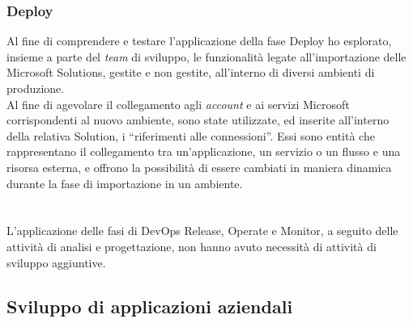 \subsubsection*{Deploy}
Al fine di comprendere e testare l'applicazione della fase Deploy ho esplorato, insieme a parte del \emph{team} di sviluppo, le funzionalità legate all'importazione delle Microsoft Solutions, gestite e non gestite, all'interno di diversi ambienti di produzione.\\ 
Al fine di agevolare il collegamento agli \emph{account} e ai servizi Microsoft corrispondenti al nuovo ambiente, sono state utilizzate, ed inserite all'interno della relativa Solution, i “riferimenti alle connessioni”. Essi sono entità che rappresentano il collegamento tra un'applicazione, un servizio o un flusso e una risorsa esterna, e offrono la possibilità di essere cambiati in maniera dinamica durante la fase di importazione in un ambiente.\\\\\\
L'applicazione delle fasi di \gls{DevOps} Release, Operate e Monitor, a seguito delle attività di analisi e progettazione, non hanno avuto necessità di attività di sviluppo aggiuntive. 

\subsection{Sviluppo di applicazioni aziendali}
\label{sviluppoApplicazioni}
